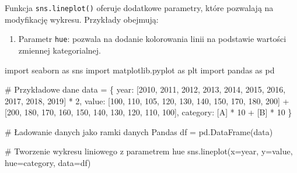 \documentclass[
  polish,
  letterpaper,
  DIV=11,
  numbers=noendperiod]{scrreprt}
\newenvironment{Shaded}{\begin{snugshade}}{\end{snugshade}}
\newcommand{\CommentTok}[1]{\textcolor[rgb]{0.37,0.37,0.37}{#1}}
\newcommand{\DecValTok}[1]{\textcolor[rgb]{0.68,0.00,0.00}{#1}}
\newcommand{\ImportTok}[1]{\textcolor[rgb]{0.00,0.46,0.62}{#1}}
\newcommand{\NormalTok}[1]{\textcolor[rgb]{0.00,0.23,0.31}{#1}}
\newcommand{\OperatorTok}[1]{\textcolor[rgb]{0.37,0.37,0.37}{#1}}
\newcommand{\StringTok}[1]{\textcolor[rgb]{0.13,0.47,0.30}{#1}}
\providecommand{\tightlist}{%
  \setlength{\itemsep}{0pt}\setlength{\parskip}{0pt}}
\begin{document}
Funkcja \texttt{sns.lineplot()} oferuje dodatkowe parametry, które
pozwalają na modyfikację wykresu. Przykłady obejmują:

\begin{enumerate}
\def\labelenumi{\arabic{enumi}.}
\tightlist
\item
  Parametr \texttt{hue}: pozwala na dodanie kolorowania linii na
  podstawie wartości zmiennej kategorialnej.
\end{enumerate}

\begin{Shaded}
\begin{Highlighting}[]
\ImportTok{import}\NormalTok{ seaborn }\ImportTok{as}\NormalTok{ sns}
\ImportTok{import}\NormalTok{ matplotlib.pyplot }\ImportTok{as}\NormalTok{ plt}
\ImportTok{import}\NormalTok{ pandas }\ImportTok{as}\NormalTok{ pd}

\CommentTok{\# Przykładowe dane}
\NormalTok{data }\OperatorTok{=}\NormalTok{ \{}
    \StringTok{\textquotesingle{}year\textquotesingle{}}\NormalTok{: [}\DecValTok{2010}\NormalTok{, }\DecValTok{2011}\NormalTok{, }\DecValTok{2012}\NormalTok{, }\DecValTok{2013}\NormalTok{, }\DecValTok{2014}\NormalTok{, }\DecValTok{2015}\NormalTok{, }\DecValTok{2016}\NormalTok{, }\DecValTok{2017}\NormalTok{, }\DecValTok{2018}\NormalTok{, }\DecValTok{2019}\NormalTok{] }\OperatorTok{*} \DecValTok{2}\NormalTok{,}
    \StringTok{\textquotesingle{}value\textquotesingle{}}\NormalTok{: [}\DecValTok{100}\NormalTok{, }\DecValTok{110}\NormalTok{, }\DecValTok{105}\NormalTok{, }\DecValTok{120}\NormalTok{, }\DecValTok{130}\NormalTok{, }\DecValTok{140}\NormalTok{, }\DecValTok{150}\NormalTok{, }\DecValTok{170}\NormalTok{, }\DecValTok{180}\NormalTok{, }\DecValTok{200}\NormalTok{] }\OperatorTok{+}
\NormalTok{             [}\DecValTok{200}\NormalTok{, }\DecValTok{180}\NormalTok{, }\DecValTok{170}\NormalTok{, }\DecValTok{160}\NormalTok{, }\DecValTok{150}\NormalTok{, }\DecValTok{140}\NormalTok{, }\DecValTok{130}\NormalTok{, }\DecValTok{120}\NormalTok{, }\DecValTok{110}\NormalTok{, }\DecValTok{100}\NormalTok{],}
    \StringTok{\textquotesingle{}category\textquotesingle{}}\NormalTok{: [}\StringTok{\textquotesingle{}A\textquotesingle{}}\NormalTok{] }\OperatorTok{*} \DecValTok{10} \OperatorTok{+}\NormalTok{ [}\StringTok{\textquotesingle{}B\textquotesingle{}}\NormalTok{] }\OperatorTok{*} \DecValTok{10}
\NormalTok{\}}

\CommentTok{\# Ładowanie danych jako ramki danych Pandas}
\NormalTok{df }\OperatorTok{=}\NormalTok{ pd.DataFrame(data)}

\CommentTok{\# Tworzenie wykresu liniowego z parametrem \textquotesingle{}hue\textquotesingle{}}
\NormalTok{sns.lineplot(x}\OperatorTok{=}\StringTok{\textquotesingle{}year\textquotesingle{}}\NormalTok{, y}\OperatorTok{=}\StringTok{\textquotesingle{}value\textquotesingle{}}\NormalTok{, hue}\OperatorTok{=}\StringTok{\textquotesingle{}category\textquotesingle{}}\NormalTok{, data}\OperatorTok{=}\NormalTok{df)}


\end{Highlighting}
\end{Shaded}
\end{document}
